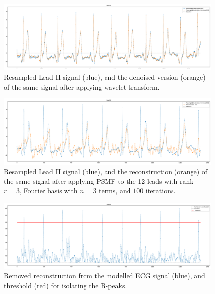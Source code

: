 \documentclass{mldsmsc}
\begin{document}
\begin{figure}[H]
\centering
\includegraphics[width=1\linewidth]{images/r_peaks/resampled_standardised_denoised_ecg_m.pdf}
\caption{Resampled Lead II signal (blue), and the denoised version (orange) of the same signal after applying wavelet transform.}
\label{fig:res-st-den-ecg}
\end{figure}

\begin{figure}[H]
\centering
\includegraphics[width=1\linewidth]{images/r_peaks/resampled_standardised_denoised_ecg_reconstruction_m.pdf}
\caption{Resampled Lead II signal (blue), and the reconstruction (orange) of the same signal after applying PSMF to the 12 leads with rank $r = 3$, Fourier basis with $n = 3$ terms, and $100$ iterations.}
\label{fig:reconstr-ecg}
\end{figure}

\begin{figure}[H]
\centering
\includegraphics[width=1\linewidth]{images/r_peaks/resampled_standardised_denoised_ecg_rpeaks_algo_m.pdf}
\caption{Removed reconstruction from the modelled ECG signal (blue), and threshold (red) for isolating the R-peaks.}
\label{fig:diff-ecg}
\end{figure}
\end{document}
